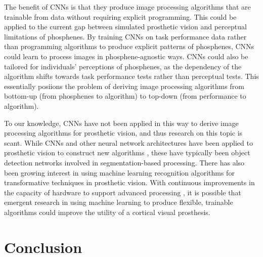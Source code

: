 \documentclass[a4paper,11pt,openany]{book}
\begin{document}
The benefit of CNNs is that they produce image processing algorithms that are trainable from data without requiring explicit programming.
This could be applied to the current gap between simulated prosthetic vision and perceptual limitations of phosphenes.
By training CNNs on task performance data rather than programming algorithms to produce explicit patterns of phosphenes, CNNs could learn to process images in phosphene-agnostic ways.
CNNs could also be tailored for individuals' perceptions of phosphenes, as the dependency of the algorithm shifts towards task performance tests rather than perceptual tests.
This essentially posiions the problem of deriving image processing algorithms from bottom-up (from phosphenes to algorithm) to top-down (from performance to algorithm).

To our knowledge, CNNs have not been applied in this way to derive image processing algorithms for prosthetic vision, and thus research on this topic is scant.
While CNNs and other neural network architectures have been applied to prosthetic vision to construct new algorithms \cite{mace_simulated_2015,ge_spiking_2017,sanchez-garcia_structural_2018}, these have typically been object detection networks involved in segmentation-based processing.
There has also been growing interest in using machine learning recognition algorithms for transformative techniques in prosthetic vision. \cite{chichilnisky_eduardo-jose_smart_2018}
With continuous improvements in the capacity of hardware to support advanced processing \cite{moore_cramming_1998}, it is possible that emergent research in using machine learning to produce flexible, trainable algorithms could improve the utility of a cortical visual prosthesis.

\clearpage

\chapter{Conclusion}
\label{sec:orgf53cf21}
\end{document}
